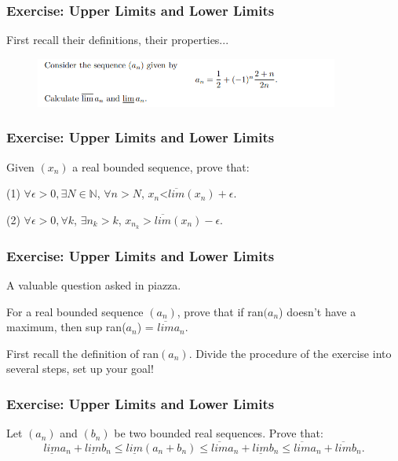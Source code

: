 \documentclass{beamer}
\begin{document}
\begin{frame}
    \frametitle{Exercise: Upper Limits and Lower Limits}
    First recall their definitions, their properties...
    \begin{figure}[htbp]
        \centering
        \includegraphics[width=10cm]{calculate.png}
    \end{figure}
\end{frame}


\begin{frame}
    \frametitle{Exercise: Upper Limits and Lower Limits}

    Given $(x_{n})$ a real bounded sequence, prove that:

    \vspace*{1em}
    \quad (1) $\forall \epsilon>0, \exists N\in \mathbb{N}$, $\forall n>N$, $x_{n}$<$\overline{lim}(x_{n})+\epsilon$.

    \vspace*{1em}
    \quad (2) $\forall \epsilon>0, \forall k$, $\exists n_{k}>k$, $x_{n_{k}}>\overline{lim}(x_{n})-\epsilon$.
\end{frame}

\begin{frame}
    \frametitle{Exercise: Upper Limits and Lower Limits}
    A valuable question asked in piazza.

    For a real bounded sequence $(a_{n})$, prove that if ran$(a_{n}$) doesn't have a maximum, then sup ran($a_{n}$) = $\overline{lim} a_{n}$.

    \vspace{5em}
    First recall the definition of ran$(a_{n})$. Divide the procedure of the exercise into several steps, set up your goal!
\end{frame}

\begin{frame}
    \frametitle{Exercise: Upper Limits and Lower Limits}
    Let $(a_{n})$ and $(b_{n})$ be two bounded real sequences. Prove that:
    \begin{equation*}
        \underline{lim}a_{n}+\underline{lim}b_{n} \leq \underline{lim}(a_{n}+b_{n}) \leq \overline{lim}a_{n}+\underline{lim}b_{n} \leq \overline{lim}a_{n} +\overline{lim}b_{n}.
    \end{equation*}
\end{frame}
\end{document}
